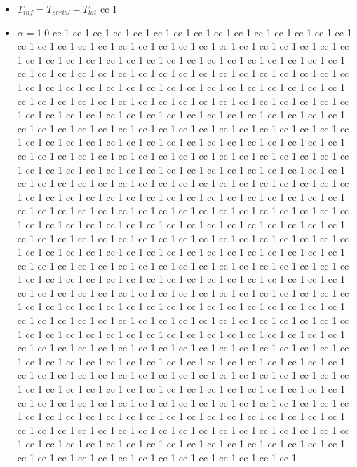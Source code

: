 \documentclass[11pt]{article}
\begin{document}
\begin{itemize}
	\item $T_{inf}=T_{serial}-T_{lat}$ cc 1
\item $\alpha=1.0$ cc 1  cc 1  cc 1  cc 1  cc 1  cc 1  cc 1  cc 1  cc 1  cc 1  cc 1  cc 1  cc 1  cc 1  cc 1  cc 1  cc 1  cc 1  cc 1  cc 1  cc 1  cc 1  cc 1  cc 1  cc 1  cc 1  cc 1  cc 1  cc 1  cc 1  cc 1  cc 1  cc 1  cc 1  cc 1  cc 1  cc 1  cc 1  cc 1  cc 1  cc 1  cc 1  cc 1  cc 1  cc 1  cc 1  cc 1  cc 1  cc 1  cc 1  cc 1  cc 1  cc 1  cc 1  cc 1  cc 1  cc 1  cc 1  cc 1  cc 1  cc 1  cc 1  cc 1  cc 1  cc 1  cc 1  cc 1  cc 1  cc 1  cc 1  cc 1  cc 1  cc 1  cc 1  cc 1  cc 1  cc 1  cc 1  cc 1  cc 1  cc 1  cc 1  cc 1  cc 1  cc 1  cc 1  cc 1  cc 1  cc 1  cc 1  cc 1  cc 1  cc 1  cc 1  cc 1  cc 1  cc 1  cc 1  cc 1  cc 1  cc 1  cc 1  cc 1  cc 1  cc 1  cc 1  cc 1  cc 1  cc 1  cc 1  cc 1  cc 1  cc 1  cc 1  cc 1  cc 1  cc 1  cc 1  cc 1  cc 1  cc 1  cc 1  cc 1  cc 1  cc 1  cc 1  cc 1  cc 1  cc 1  cc 1  cc 1  cc 1  cc 1  cc 1  cc 1  cc 1  cc 1  cc 1  cc 1  cc 1  cc 1  cc 1  cc 1  cc 1  cc 1  cc 1  cc 1  cc 1  cc 1  cc 1  cc 1  cc 1  cc 1  cc 1  cc 1  cc 1  cc 1  cc 1  cc 1  cc 1  cc 1  cc 1  cc 1  cc 1  cc 1  cc 1  cc 1  cc 1  cc 1  cc 1  cc 1  cc 1  cc 1  cc 1  cc 1  cc 1  cc 1  cc 1  cc 1  cc 1  cc 1  cc 1  cc 1  cc 1  cc 1  cc 1  cc 1  cc 1  cc 1  cc 1  cc 1  cc 1  cc 1  cc 1  cc 1  cc 1  cc 1  cc 1  cc 1  cc 1  cc 1  cc 1  cc 1  cc 1  cc 1  cc 1  cc 1  cc 1  cc 1  cc 1  cc 1  cc 1  cc 1  cc 1  cc 1  cc 1  cc 1  cc 1  cc 1  cc 1  cc 1  cc 1  cc 1  cc 1  cc 1  cc 1  cc 1  cc 1  cc 1  cc 1  cc 1  cc 1  cc 1  cc 1  cc 1  cc 1  cc 1  cc 1  cc 1  cc 1  cc 1  cc 1  cc 1  cc 1  cc 1  cc 1  cc 1  cc 1  cc 1  cc 1  cc 1  cc 1  cc 1  cc 1  cc 1  cc 1  cc 1  cc 1  cc 1  cc 1  cc 1  cc 1  cc 1  cc 1  cc 1  cc 1  cc 1  cc 1  cc 1  cc 1  cc 1  cc 1  cc 1  cc 1  cc 1  cc 1  cc 1  cc 1  cc 1  cc 1  cc 1  cc 1  cc 1  cc 1  cc 1  cc 1  cc 1  cc 1  cc 1  cc 1  cc 1  cc 1  cc 1  cc 1  cc 1  cc 1  cc 1  cc 1  cc 1  cc 1  cc 1  cc 1  cc 1  cc 1  cc 1  cc 1  cc 1  cc 1  cc 1  cc 1  cc 1  cc 1  cc 1  cc 1  cc 1  cc 1  cc 1  cc 1  cc 1  cc 1  cc 1  cc 1  cc 1  cc 1  cc 1  cc 1  cc 1  cc 1  cc 1  cc 1  cc 1  cc 1  cc 1  cc 1  cc 1  cc 1  cc 1  cc 1  cc 1  cc 1  cc 1  cc 1  cc 1  cc 1  cc 1  cc 1  cc 1  cc 1  cc 1  cc 1  cc 1  cc 1  cc 1  cc 1  cc 1  cc 1  cc 1  cc 1  cc 1  cc 1  cc 1  cc 1  cc 1  cc 1  cc 1  cc 1  cc 1  cc 1  cc 1  cc 1  cc 1  cc 1  cc 1  cc 1  cc 1  cc 1  cc 1  cc 1  cc 1  cc 1  cc 1  cc 1  cc 1  cc 1  cc 1  cc 1  cc 1  cc 1  cc 1  cc 1  cc 1  cc 1  cc 1  cc 1  cc 1  cc 1  cc 1  cc 1  cc 1  cc 1  cc 1  cc 1  cc 1  cc 1  cc 1  cc 1  cc 1  cc 1  cc 1  cc 1  cc 1  cc 1  cc 1  cc 1  cc 1  cc 1  cc 1  cc 1  cc 1  cc 1  cc 1  cc 1  cc 1  cc 1  cc 1  cc 1  cc 1  cc 1  cc 1  cc 1  cc 1  cc 1  cc 1  cc 1  cc 1  cc 1  cc 1  cc 1  cc 1  cc 1  cc 1  cc 1  cc 1  cc 1  cc 1  cc 1  cc 1  cc 1  cc 1  cc 1  cc 1  cc 1  cc 1  cc 1  cc 1  cc 1  cc 1  cc 1  cc 1  cc 1  cc 1  cc 1  cc 1  cc 1  cc 1  cc 1  cc 1  cc 1  cc 1  cc 1  cc 1  cc 1  cc 1  cc 1  cc 1  cc 1  cc 1  cc 1  cc 1  cc 1  cc 1  cc 1  cc 1  cc 1  cc 1  cc 1  cc 1  cc 1  cc 1  cc 1  cc 1  cc 1  cc 1  cc 1  cc 1  cc 1  cc 1  cc 1  cc 1  cc 1  cc 1  cc 1  cc 1  cc 1  cc 1  cc 1  cc 1  cc 1  cc 1  cc 1  cc 1  cc 1  cc 1  cc 1  cc 1  cc 1  cc 1  cc 1  cc 1  cc 1  cc 1  cc 1  cc 1  cc 1

\end{itemize}
\end{document}
